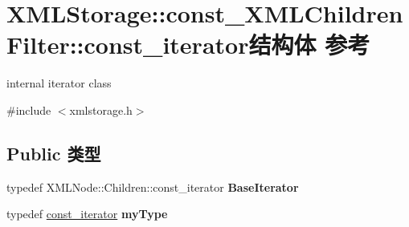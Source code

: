\hypertarget{struct_x_m_l_storage_1_1const___x_m_l_children_filter_1_1const__iterator}{}\section{X\+M\+L\+Storage\+:\+:const\+\_\+\+X\+M\+L\+Children\+Filter\+:\+:const\+\_\+iterator结构体 参考}
\label{struct_x_m_l_storage_1_1const___x_m_l_children_filter_1_1const__iterator}


internal iterator class  




{\ttfamily \#include $<$xmlstorage.\+h$>$}

\subsection*{Public 类型}
\begin{DoxyCompactItemize}
\item 
\mbox{\label{struct_x_m_l_storage_1_1const___x_m_l_children_filter_1_1const__iterator_ab1cf1895d9d269fd443a2c7654c98c2d}} 
typedef X\+M\+L\+Node\+::\+Children\+::const\+\_\+iterator {\bfseries Base\+Iterator}
\item 
\mbox{\label{struct_x_m_l_storage_1_1const___x_m_l_children_filter_1_1const__iterator_aa3ed14b1bc2c875f80062c2029e4173d}} 
typedef \hyperlink{struct_x_m_l_storage_1_1const___x_m_l_children_filter_1_1const__iterator}{const\+\_\+iterator} {\bfseries my\+Type}
\end{DoxyCompactItemize}
